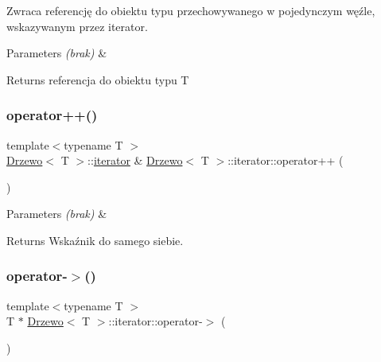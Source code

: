 Zwraca referencję do obiektu typu przechowywanego w pojedynczym węźle, wskazywanym przez iterator.


\begin{DoxyParams}{Parameters}
{\em (brak)} & \\
\hline
\end{DoxyParams}
\begin{DoxyReturn}{Returns}
referencja do obiektu typu T 
\end{DoxyReturn}
\mbox{\label{class_drzewo_1_1iterator_a8b67f4409ee4532a89e745744ba6f8b3}} 
\subsubsection{\texorpdfstring{operator++()}{operator++()}}
{\footnotesize\ttfamily template$<$typename T $>$ \\
\hyperlink{class_drzewo}{Drzewo}$<$ T $>$\+::\hyperlink{class_drzewo_1_1iterator}{iterator} \& \hyperlink{class_drzewo}{Drzewo}$<$ T $>$\+::iterator\+::operator++ (\begin{DoxyParamCaption}{ }\end{DoxyParamCaption})}


\begin{DoxyParams}{Parameters}
{\em (brak)} & \\
\hline
\end{DoxyParams}
\begin{DoxyReturn}{Returns}
Wskaźnik do samego siebie. 
\end{DoxyReturn}
\mbox{\label{class_drzewo_1_1iterator_ac982660e25eb9720b5c81b6ccff0559e}} 
\subsubsection{\texorpdfstring{operator-\/$>$()}{operator->()}}
{\footnotesize\ttfamily template$<$typename T $>$ \\
T $\ast$ \hyperlink{class_drzewo}{Drzewo}$<$ T $>$\+::iterator\+::operator-\/$>$ (\begin{DoxyParamCaption}{ }\end{DoxyParamCaption})\hspace{0.3cm}{\ttfamily [inline]}}


